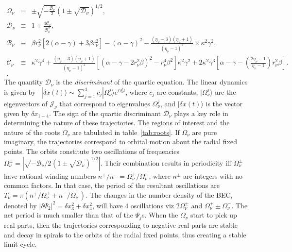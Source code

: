 \documentclass[a4paper,10pt]{article}
\begin{document}
\begin{eqnarray}
\label{roots:jacobian:nobosonint}
\Omega_\nu &=& \pm\sqrt{-\frac{\mathcal{B}_\nu}{2}}\left(1\pm\sqrt{\mathcal{D}_\nu}\right)^{1/2},\nonumber \\
 \mathcal{D}_\nu&\equiv& 1+\frac{4\mathcal{C}_\nu}{\mathcal{B}_\nu^2},\\
\label{nobosonint:coeff}
\mathcal{B}_\nu &\equiv& \beta r_\nu^2 \left[2\left(\alpha-\gamma\right)+3\beta r_\nu^2 \right]-\left(\alpha-\gamma\right)^2-
\frac{\left(\eta_\nu-3\right)\left(\eta_\nu+1\right)}{\left(\eta_\nu-1\right)^2}\times\kappa^2\gamma^2,\nonumber \\
\mathcal{C}_\nu &\equiv& \kappa^2\gamma^4+\frac{\left(\eta_\nu-3\right)\left(\eta_\nu+1\right)}{\left(\eta_\nu-1\right)^2}
\left[\left(\alpha-\gamma-2r^2_\nu\beta\right)^2-r^4_\nu\beta^2 \right]\kappa^2\gamma^2+2\kappa^2\gamma^3\left[\alpha-\gamma-\left(\frac{2\eta_\nu-1}{\eta_\nu-1}\right)r^2_\nu\beta\right].\nonumber \\.
\end{eqnarray}
The quantity $\mathcal{D}_\nu$ is the \textit{discriminant} of the quartic equation. The linear dynamics is given by~\cite{strogatz:book} $|\delta x (t) \rangle \sim \sum^{4}_{j=1} c_j |\Omega^j_\nu\rangle e^{\Omega^j_\nu t}$, where $c_j$ are constants, $|\Omega^j_\nu\rangle$ are the eigenvectors of $\mathcal{J}_\nu$  that correspond to eigenvalues $\Omega^j_\nu$, and $|\delta x (t) \rangle$ is the vector given by $\delta x_{1-4}$. The sign of the quartic discriminant $\mathcal{D}_\nu$ plays a key role in determining the nature of these trajectories. The regions of interest and the nature of the roots $\Omega_\nu$ are tabulated in table~\ref{tab:roots}. If $\Omega_\nu$ are pure imaginary, the trajectories correspond to orbital motion about the radial fixed points. The orbits constitute two oscillations of frequencies $\Omega^{\pm}_\nu=|\sqrt{-{\mathcal{B}_\nu}/{2}}(1\pm\sqrt{\mathcal{D}_\nu})^{1/2}|$. Their combination results in periodicity iff $\Omega^\pm_\nu$ have rational winding numbers $n^+/n^- = \Omega^+_\nu/\Omega^-_\nu$, where $n^\pm$ are integers with no common factors. In that case, the period of the resultant oscillations are $T_\nu = \pi (n^+/\Omega^+_\nu + n^-/\Omega^-_\nu)$. The changes in the number density of the BEC, denoted by $|\delta \Psi_2|^2=\delta x^2_3 + \delta x^2_4$, will have $4$ oscillations viz $2\Omega^\pm_\nu$ and $\Omega^+_\nu\pm\Omega^-_\nu$. The net period is much smaller than that of the $\Psi_j$s. When the $\Omega_\nu$ start to pick up real parts, then the trajectories corresponding to negative real parts are stable and decay in spirals to the orbits of the radial fixed points, thus creating a stable limit cycle. 
\end{document}
